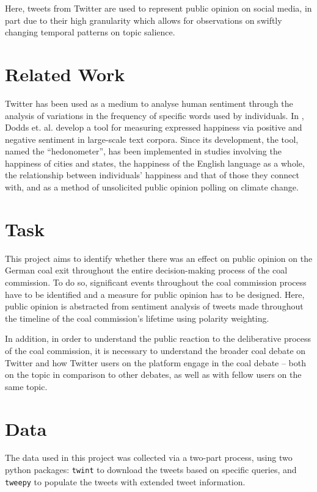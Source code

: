 \documentclass[10pt,twocolumn,twoside]{layout}
\begin{document}
Here, tweets from Twitter are used to represent public opinion on social media, in part due to their high granularity which allows for observations on swiftly changing temporal patterns on topic salience.

\section*{Related Work} \label{sec:relatedwork}

Twitter has been used as a medium to analyse human sentiment through the analysis of variations in the frequency of specific words used by individuals. In \cite{Dodds2011}, Dodds et. al. develop a tool for measuring expressed happiness via positive and negative sentiment in large-scale text corpora. Since its development, the tool, named the ``hedonometer'', has been implemented in studies involving the happiness of cities and states, the happiness of the English language as a whole, the relationship between individuals' happiness and that of those they connect with, and as a method of unsolicited public opinion polling on climate change. \cite{Cody2015} %

\section*{Task} \label{sec:task}
This project aims to identify whether there was an effect on public opinion on the German coal exit throughout the entire decision-making process of the coal commission. To do so, significant events throughout the coal commission process have to be identified and a measure for public opinion has to be designed. Here, public opinion is abstracted from sentiment analysis of tweets made throughout the timeline of the coal commission's lifetime using polarity weighting. 

In addition, in order to understand the public reaction to the deliberative process of the coal commission, it is necessary to understand the broader coal debate on Twitter and how Twitter users on the platform engage in the coal debate -- both on the topic in comparison to other debates, as well as with fellow users on the same topic. 

\section*{Data} \label{sec:data}
The data used in this project was collected via a two-part process, using two python packages: \texttt{twint} to download the tweets based on specific queries, and \texttt{tweepy} to populate the tweets with extended tweet information. %
\end{document}
